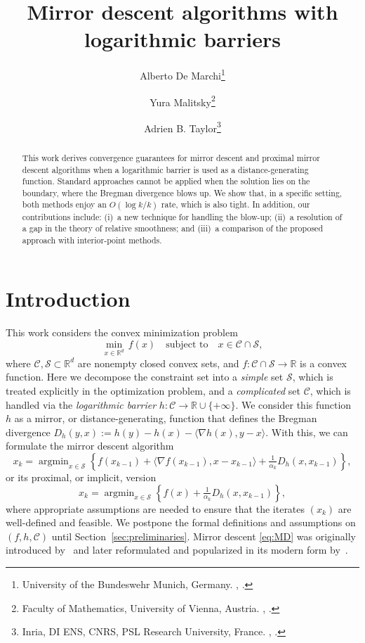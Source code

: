 \documentclass[a4paper]{article}
\title{\bfseries Mirror descent algorithms with logarithmic barriers}
\author{%
        Alberto De Marchi\thanks{University of the Bundeswehr Munich, Germany. \email{alberto.demarchi@unibw.de}, \orcid{0000-0002-3545-6898}.}%
        \and%
        Yura Malitsky\thanks{Faculty of Mathematics, University of Vienna, Austria. \email{yurii.malitskyi@univie.ac.at}, \orcid{0000-0001-7325-5766}.}%
        \and%
        Adrien B. Taylor\footnote{Inria, DI ENS, CNRS, PSL Research University, France. \email{adrien.taylor@inria.fr}, \orcid{0000-0003-2509-1765}.}%
}
\date{}
\newcommand{\CC}{\mathcal{C}}
\renewcommand{\SS}{\mathcal{S}}
\newcommand{\coloneqq}{:=}
\newcommand{\R}{\mathbb{R}}
\newcommand{\ip}[2]{\langle #1, #2\rangle}
\DeclareMathOperator*{\argmin}{argmin}
\begin{document}
\maketitle

\begin{abstract}
This work derives convergence guarantees for mirror descent and proximal mirror descent algorithms when a logarithmic barrier is used as a distance-generating function.
Standard approaches cannot be applied when the solution lies on the boundary, where the Bregman divergence blows up.
We show that, in a specific setting, both methods enjoy an $O(\log k / k)$ rate, which is also tight.
In addition, our contributions include: (i)~a new technique for handling the blow-up; (ii)~a resolution of a gap in the theory of relative smoothness; and (iii)~a comparison of the proposed approach with interior-point methods.
\end{abstract}

\section{Introduction}\label{sec:intro}

This work considers the convex minimization problem
\begin{equation}
\min_{x \in \R^d}\, f(x) \quad \text{subject to} \quad x \in \CC\cap \SS,
\label{eq:prob} 
\end{equation}
where $\CC, \SS \subset \R^d$ are nonempty closed convex sets, and $f\colon\CC\cap\SS\to \R$ is a convex function.
Here we decompose the constraint set into a \emph{simple} set $\SS$, which is treated explicitly in the optimization problem, and a \emph{complicated} set $\CC$, which is handled via the \emph{logarithmic barrier} $h\colon \CC \to \R\cup\{+\infty\}$.
We consider this function $h$ as a mirror, or distance-generating, function that defines the Bregman divergence $D_h(y,x)\coloneqq h(y)-h(x)-\ip{\nabla h(x)}{y-x}$.
With this, we can formulate the mirror descent algorithm
\begin{equation}\label{eq:MD}\tag{MD}
x_{k} = \argmin_{x\in \SS}\left\{ f(x_{k-1}) + \ip{\nabla f(x_{k-1})}{x - x_{k-1}} + \tfrac{1}{\alpha_k} D_{h}(x,x_{k-1})\right\},
\end{equation}
or its proximal, or implicit, version
\begin{equation}\label{eq:proxMD}\tag{proxMD}
x_{k} = \argmin_{x\in\SS}\left\{ f(x) + \tfrac{1}{\alpha_k} D_{h}(x,x_{k-1})\right\},
\end{equation}
where appropriate assumptions are needed to ensure that the iterates $(x_k)$ are well-defined and feasible.
We postpone the formal definitions and assumptions on $(f,h,\CC)$ until Section~\ref{sec:preliminaries}.
Mirror descent \eqref{eq:MD} was originally introduced by~\cite{nemirovskii1983problem} and later reformulated and popularized in its modern form by~\cite{beck2003mirror}.
\end{document}
